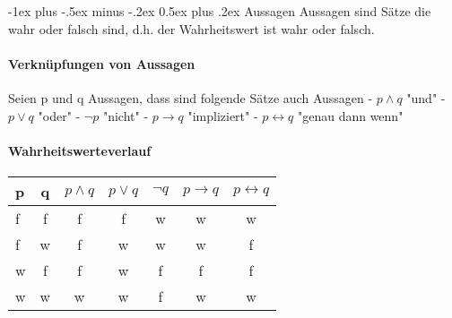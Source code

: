 \documentclass[10pt,landscape]{article}
\makeatletter
\renewcommand{\section}{\@startsection{section}{1}{0mm}%
                                {-1ex plus -.5ex minus -.2ex}%
                                {0.5ex plus .2ex}%
                                {\normalfont\large\bfseries}}
\makeatother
\begin{document}
\raggedright
\footnotesize
\begin{multicols}{3}


\setlength{\premulticols}{1pt}
\setlength{\postmulticols}{1pt}
\setlength{\multicolsep}{1pt}
\setlength{\columnsep}{2pt}

\section{Aussagen}
Aussagen sind Sätze die wahr oder falsch sind, d.h. der Wahrheitswert ist wahr oder falsch.

\paragraph{Verknüpfungen von Aussagen}
Seien p und q Aussagen, dass sind folgende Sätze auch Aussagen
- $p \wedge q$ "und"
- $p \vee q$ "oder"
- $\neg p$ "nicht"
- $p \rightarrow q$ "impliziert"
- $p \leftrightarrow q$ "genau dann wenn"

\paragraph{Wahrheitswerteverlauf}
\begin{tabular}{ l | c | c | c | c | c | c }
    p & q & $p\wedge q$ & $p\vee q$ & $\neg q$ & $p\rightarrow q$ & $p\leftrightarrow q$\\
    \hline
    f & f & f & f & w & w & w\\
    f & w & f & w & w & w & f\\
    w & f & f & w & f & f & f\\
    w & w & w & w & f & w & w\\
\end{tabular}


\end{multicols}
\end{document}
